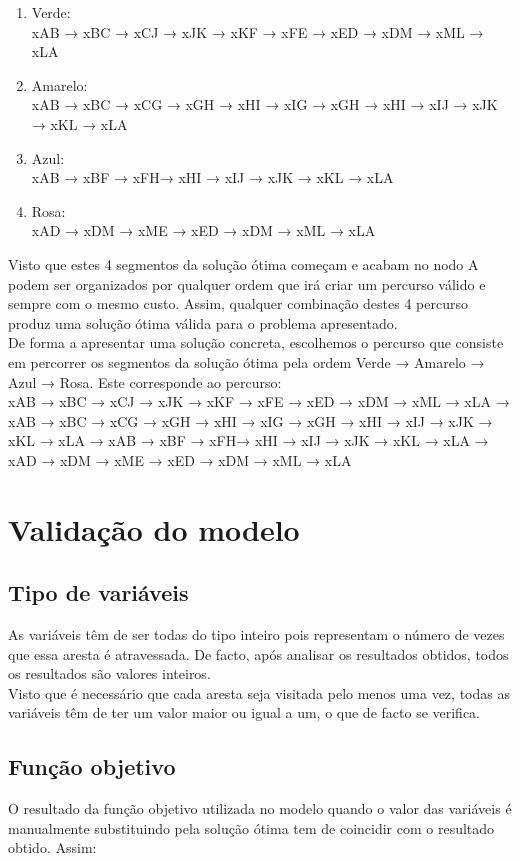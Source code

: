 \documentclass[a4paper]{report}
\begin{document}
\begin{enumerate}
    \item Verde: \\
    xAB → xBC → xCJ → xJK → xKF → xFE → xED → xDM → xML → xLA
    \item Amarelo: \\
    xAB → xBC → xCG → xGH → xHI  → xIG → xGH → xHI → xIJ → xJK  → xKL  → xLA
    \item Azul: \\
    xAB → xBF → xFH→ xHI  → xIJ → xJK  → xKL  → xLA
    \item Rosa: \\
    xAD → xDM → xME → xED  → xDM → xML → xLA
\end{enumerate}
Visto que estes 4 segmentos da solução ótima começam e acabam no nodo A podem
ser organizados por qualquer ordem que irá criar um percurso válido e sempre com
o mesmo custo. Assim, qualquer combinação destes 4 percurso produz uma solução
ótima válida para o problema apresentado.\\
De forma a apresentar uma solução concreta, escolhemos o percurso que consiste em
percorrer os segmentos da solução ótima pela ordem Verde → Amarelo → Azul →
Rosa. Este corresponde ao percurso:\\
xAB → xBC → xCJ → xJK → xKF → xFE → xED → xDM → xML → xLA →
xAB → xBC → xCG → xGH → xHI  → xIG → xGH → xHI → xIJ → xJK  → xKL  → xLA →
xAB → xBF → xFH→ xHI  → xIJ → xJK  → xKL  → xLA →
xAD → xDM → xME → xED  → xDM → xML → xLA

\pagebreak
\section{Validação do modelo}
\subsection{Tipo de variáveis}
As variáveis têm de ser todas do tipo inteiro pois representam o número
de vezes que essa aresta é atravessada.
De facto, após analisar os resultados obtidos, todos os resultados são
valores inteiros.\\
Visto que é necessário que cada aresta seja visitada pelo menos uma
vez, todas as variáveis têm de ter um valor maior ou igual a um, o
que de facto se verifica.

\subsection{Função objetivo}
O resultado da função objetivo utilizada no modelo quando o valor
das variáveis é manualmente substituindo pela solução ótima tem de 
coincidir com o resultado obtido.
Assim:
\end{document}
